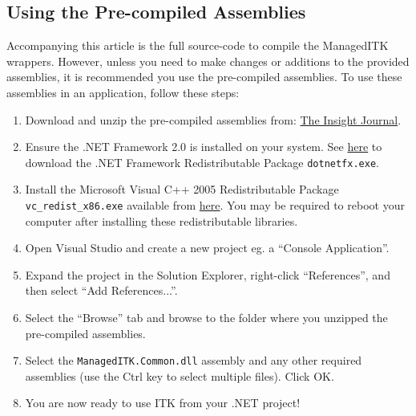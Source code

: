 \documentclass{InsightArticle}
\def\code#1{\texttt{#1}}
\begin{document}
\subsection{Using the Pre-compiled Assemblies}
\label{sec:UsingPreCompiledAssemblies}
Accompanying this article is the full source-code to compile the
ManagedITK wrappers.
However, unless you need to make changes or additions to the provided assemblies,
it is recommended you use the pre-compiled assemblies.
To use these assemblies in an application, follow these steps:
\begin{enumerate}
	\item Download and unzip the pre-compiled assemblies from: %
			\href{http://insight-journal.org/dspace/handle/1926/501}
			     {The Insight Journal}.
	\item Ensure the .NET Framework 2.0 is installed on your system.
		  See 
\href{http://www.microsoft.com/downloads/details.aspx?familyid=0856EACB-4362-4B0D-8EDD-AAB15C5E04F5}{here} to download the .NET Framework Redistributable Package \code{dotnetfx.exe}.
	\item Install the Microsoft Visual C++ 2005 Redistributable Package
		  \code{vc\_redist\_x86.exe} available from %
		  \href{http://www.microsoft.com/downloads/details.aspx?FamilyID=200B2FD9-AE1A-4A14-984D-389C36F85647}{here}.
		  You may be required to reboot your computer after installing these
		  redistributable libraries.
	\item Open Visual Studio and create a new project eg. a ``Console Application''.
	\item Expand the project in the Solution Explorer, right-click ``References'', and then
			select ``Add References...''.
	\item Select the ``Browse'' tab and browse to the folder where you 
			unzipped the pre-compiled assemblies. 
	\item Select the \code{ManagedITK.Common.dll} assembly and any other required
		    assemblies (use the Ctrl key to select multiple files). Click OK.
	\item You are now ready to use ITK from your .NET project!
\end{enumerate}
\end{document}

